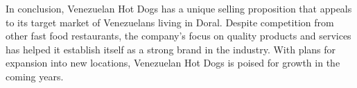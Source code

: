 In conclusion, Venezuelan Hot Dogs has a unique selling proposition that appeals to its target market of Venezuelans living in Doral. Despite competition from other fast food restaurants, the company's focus on quality products and services has helped it establish itself as a strong brand in the industry. With plans for expansion into new locations, Venezuelan Hot Dogs is poised for growth in the coming years.